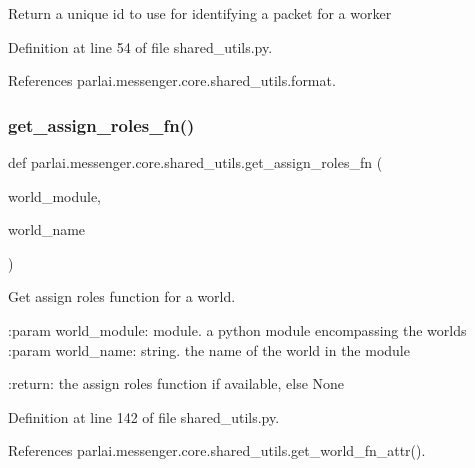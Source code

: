 \begin{DoxyVerb}Return a unique id to use for identifying a packet for a worker\end{DoxyVerb}
 

Definition at line 54 of file shared\+\_\+utils.\+py.



References parlai.\+messenger.\+core.\+shared\+\_\+utils.\+format.

\mbox{\label{namespaceparlai_1_1messenger_1_1core_1_1shared__utils_ae5c062bdee92b3a18f187904e0ec8120}} 
\subsubsection{\texorpdfstring{get\+\_\+assign\+\_\+roles\+\_\+fn()}{get\_assign\_roles\_fn()}}
{\footnotesize\ttfamily def parlai.\+messenger.\+core.\+shared\+\_\+utils.\+get\+\_\+assign\+\_\+roles\+\_\+fn (\begin{DoxyParamCaption}\item[{}]{world\+\_\+module,  }\item[{}]{world\+\_\+name }\end{DoxyParamCaption})}

\begin{DoxyVerb}Get assign roles function for a world.

:param world_module:
    module. a python module encompassing the worlds
:param world_name:
    string. the name of the world in the module

:return:
    the assign roles function if available, else None
\end{DoxyVerb}
 

Definition at line 142 of file shared\+\_\+utils.\+py.



References parlai.\+messenger.\+core.\+shared\+\_\+utils.\+get\+\_\+world\+\_\+fn\+\_\+attr().

